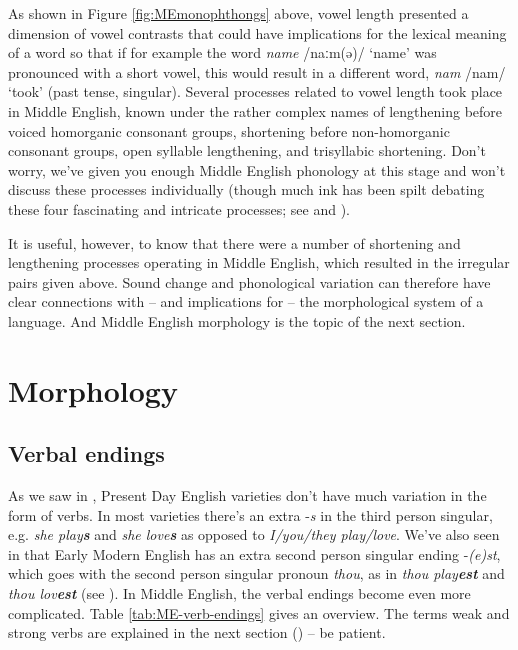 As shown in Figure \ref{fig:MEmonophthongs} above, vowel length presented a dimension of vowel contrasts that could have implications for the lexical meaning of a word so that if for example the word \textit{name} /naːm(ə)/ `name' was pronounced with a short vowel, this would result in a different word, \textit{nam} /nam/ `took' (past tense, singular). Several processes related to vowel length took place in Middle English, known under the rather complex names of lengthening before voiced homorganic consonant groups, shortening before non-homorganic consonant groups, open syllable lengthening, and trisyllabic shortening. Don't worry, we've given you enough Middle English phonology at this stage and won't discuss these processes individually (though much ink has been spilt debating these four fascinating and intricate processes; see \citealp[156--159]{MillHay2018} and \citealp[§7.5]{Minkova2014}).

It is useful, however, to know that there were a number of shortening and lengthening processes operating in Middle English, which resulted in the irregular pairs given above. Sound change and phonological variation can therefore have clear connections with -- and implications for -- the morphological system of a language. And Middle English morphology is the topic of the next section.


\section{Morphology}

\subsection{Verbal endings}\label{ME-verbal-endings}
As we saw in , Present Day English varieties don't have much variation in the form of verbs. In most varieties there's an extra -\emph{s} in the third person singular, e.g. \emph{she play\textbf{s}} and \emph{she love\textbf{s}} as opposed to \emph{I/you/they play/love}. We've also seen in  that Early Modern English has an extra second person singular ending -\emph{(e)st}, which goes with the second person singular pronoun \emph{thou}, as in \emph{thou play\textbf{est}} and \emph{thou lov\textbf{est}} (see ). In Middle English, the verbal endings become even more complicated. Table \ref{tab:ME-verb-endings} gives an overview. The terms weak and strong verbs are explained in the next section () -- be patient.

